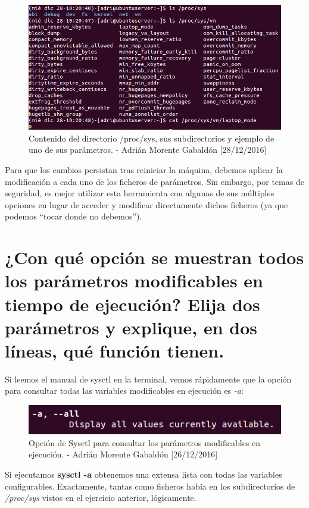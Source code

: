 \begin{figure}[H]
	\centering
	\includegraphics[scale=0.7]{proc-sys}
	\caption{Contenido del directorio /proc/sys, sus subdirectorios y ejemplo de uno de sus parámetros. - Adrián
	Morente Gabaldón [28/12/2016]}
	\label{figura3}
\end{figure}
Para que los cambios persistan tras reiniciar la máquina, debemos aplicar la modificación a cada uno de los ficheros
de parámetros. Sin embargo, por temas de seguridad, es mejor utilizar esta herramienta con algunas de sus múltiples
opciones en lugar de acceder y modificar directamente dichos ficheros (ya que podemos ``tocar donde no debemos'').


\section{¿Con qué opción se muestran todos los parámetros modificables en tiempo de ejecución? Elija dos parámetros
y explique, en dos líneas, qué función tienen.}
Si leemos el manual de sysctl en la terminal, vemos rápidamente que la opción para consultar todas las variables
modificables en ejecución es \emph{-a}:
\begin{figure}[H]
	\centering
	\includegraphics[scale=0.7]{sysctl-a}
	\caption{Opción de Sysctl para consultar los parámetros modificables en ejecución. - Adrián Morente Gabaldón [26/12/2016]}
	\label{figura2}
\end{figure}
Si ejecutamos \textbf{sysctl -a} obtenemos una extensa lista con todas las variables configurables. Exactamente,
tantas como ficheros había en los subdirectorios de \emph{/proc/sys} vistos en el ejercicio anterior, lógicamente.

